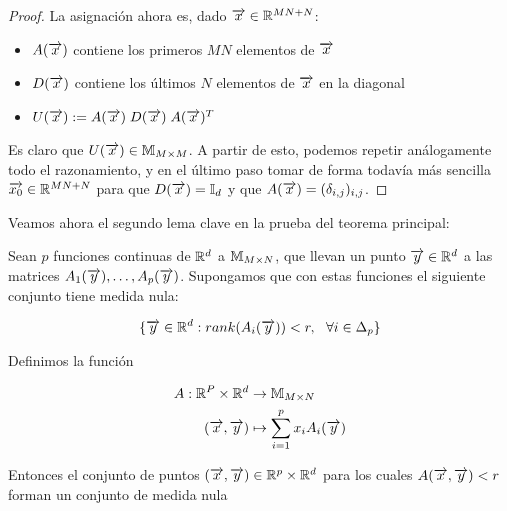 \begin{proof}
    La asignación ahora es, dado $\overrightarrow{x} \in \mathbb{R}^{MN + N}$:

    \begin{itemize}
        \item $A(\overrightarrow{x})$ contiene los primeros $MN$ elementos de $\overrightarrow{x}$
        \item $D(\overrightarrow{x})$ contiene los últimos $N$ elementos de $\overrightarrow{x}$ en la diagonal
        \item $U(\overrightarrow{x}) := A(\overrightarrow{x}) \; D(\overrightarrow{x}) \; A(\overrightarrow{x})^T$
    \end{itemize}

    Es claro que $U(\overrightarrow{x}) \in \mathbb{M}_{M \times M}$. A partir de esto, podemos repetir análogamente todo el razonamiento, y en el último paso tomar de forma todavía más sencilla $\overrightarrow{x_0} \in \mathbb{R}^{MN + N}$ para que $D(\overrightarrow{x}) = \mathbb{I}_d$ y que $A(\overrightarrow{x}) = (\delta_{i, j})_{i, j}$.
\end{proof}


Veamos ahora el segundo lema clave en la prueba del teorema principal:

\begin{lema} \label{lema:segundo_lema}
    Sean $p$ funciones continuas de $\mathbb{R}^d$ a $\mathbb{M}_{M \times N}$, que llevan un punto $\overrightarrow{y} \in \mathbb{R}^d$ a las matrices $A_1(\overrightarrow{y}), \ldots, A_p(\overrightarrow{y})$. Supongamos que con estas funciones el siguiente conjunto tiene medida nula:

    \begin{equation}
        \{ \overrightarrow{y} \in \mathbb{R}^d : rank(A_i(\overrightarrow{y})) < r, \ \  \forall i \in \Delta_{p} \}
    \end{equation}

    Definimos la función

    \begin{equation}
        \begin{split}
            A: \mathbb{R}^P \times \mathbb{R}^d &\to \mathbb{M}_{M \times N} \\
            (\overrightarrow{x}, \overrightarrow{y}) &\mapsto \sum_{i = 1}^p x_i A_i(\overrightarrow{y})
        \end{split}
    \end{equation}

    Entonces el conjunto de puntos $(\overrightarrow{x}, \overrightarrow{y}) \in \mathbb{R}^p \times \mathbb{R}^d$ para los cuales $A(\overrightarrow{x}, \overrightarrow{y}) < r$ forman un conjunto de medida nula
\end{lema}

